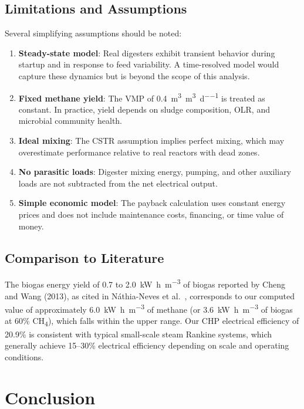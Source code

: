 \documentclass[12pt, letterpaper]{article}
\begin{document}
\subsection{Limitations and Assumptions}

Several simplifying assumptions should be noted:
\begin{enumerate}[noitemsep]
  \item \textbf{Steady-state model}: Real digesters exhibit transient behavior during startup and in response to feed variability. A time-resolved model would capture these dynamics but is beyond the scope of this analysis.
  \item \textbf{Fixed methane yield}: The VMP of \SI{0.4}{\cubic\metre\per\cubic\metre\per\day} is treated as constant. In practice, yield depends on sludge composition, OLR, and microbial community health.
  \item \textbf{Ideal mixing}: The CSTR assumption implies perfect mixing, which may overestimate performance relative to real reactors with dead zones.
  \item \textbf{No parasitic loads}: Digester mixing energy, pumping, and other auxiliary loads are not subtracted from the net electrical output.
  \item \textbf{Simple economic model}: The payback calculation uses constant energy prices and does not include maintenance costs, financing, or time value of money.
\end{enumerate}

\subsection{Comparison to Literature}

The biogas energy yield of \SI{0.7}{} to \SI{2.0}{\kilo\watt\hour\per\cubic\metre} of biogas reported by Cheng and Wang (2013), as cited in N\'{a}thia-Neves et al.~\citep{nathia2018}, corresponds to our computed value of approximately \SI{6.0}{\kilo\watt\hour\per\cubic\metre} of methane (or \SI{3.6}{\kilo\watt\hour\per\cubic\metre} of biogas at 60\% CH\textsubscript{4}), which falls within the upper range. Our CHP electrical efficiency of 20.9\% is consistent with typical small-scale steam Rankine systems, which generally achieve 15--30\% electrical efficiency depending on scale and operating conditions.

\section{Conclusion}
\end{document}
